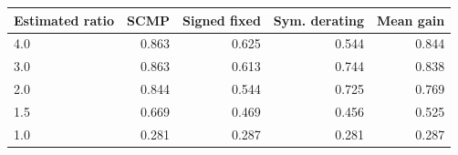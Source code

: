 \begin{tabular}{lrrrr}
\toprule
Estimated ratio & SCMP & Signed fixed & Sym. derating & Mean gain \\
\midrule
4.0 & 0.863 & 0.625 & 0.544 & 0.844 \\
3.0 & 0.863 & 0.613 & 0.744 & 0.838 \\
2.0 & 0.844 & 0.544 & 0.725 & 0.769 \\
1.5 & 0.669 & 0.469 & 0.456 & 0.525 \\
1.0 & 0.281 & 0.287 & 0.281 & 0.287 \\
\bottomrule
\end{tabular}

